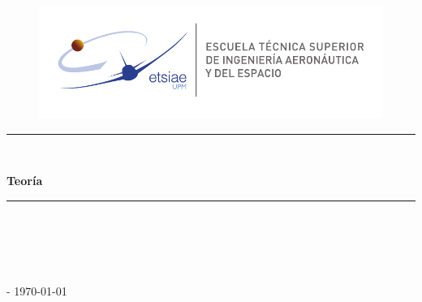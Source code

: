 \begin{titlepage}
    \begin{center}
    
        \begin{figure}[!htb]
            \centering
            \includegraphics[width = 0.9\linewidth]{include/figures/logo.pdf}
        \end{figure}
        \rule{\linewidth}{0.3mm}\\

        \vspace*{1cm}
        \begin{huge}
          \textbf{Teoría}
        \end{huge}
        
        \vspace*{0.1cm}
        \begin{large}
          \underline{\textsc{\Subject}}
        \end{large}

        \vspace*{0.5cm}        
        \rule{\linewidth}{0.3mm}\\        
        \vspace*{1cm}
        \begin{small}
            \textbf{ \Degree } \\
            \Especiality
        \end{small}

        \vspace*{6cm}
        \begin{large}
			\textsc{\Author} \\
            \textsc{\Location - \today}
		\end{large}
    \end{center}
\end{titlepage}

\thispagestyle{empty}
\cleardoublepage
